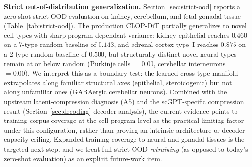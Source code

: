 \documentclass[11pt,a4paper]{article}
\begin{document}
\textbf{Strict out-of-distribution generalization.} Section~\ref{sec:strict-ood} reports a zero-shot strict-OOD evaluation on kidney, cerebellum, and fetal gonadal tissue (Table~\ref{tab:strict-ood}). The production CLOP-DiT partially generalizes to novel cell types with sharp program-dependent variance: kidney epithelial reaches $0.460$ on a 7-type random baseline of $0.143$, and adrenal cortex type~I reaches $0.875$ on a 2-type random baseline of $0.500$, but structurally-distinct novel neural types remain at or below random (Purkinje cells $= 0.00$, cerebellar interneurons $= 0.00$). We interpret this as a boundary test: the learned cross-type manifold extrapolates along familiar structural axes (epithelial, steroidogenic) but not along unfamiliar ones (GABAergic cerebellar neurons). Combined with the upstream latent-compression diagnosis (A5) and the scGPT-specific compression result (Section~\ref{sec:decoding} decoder analysis), the current evidence points to training-corpus coverage at the cell-program level as the practical limiting factor under this configuration, rather than proving an intrinsic architecture or decoder-capacity ceiling. Expanded training coverage to neural and gonadal tissues is the targeted next step, and we treat full strict-OOD \emph{retraining} (as opposed to today's zero-shot evaluation) as an explicit future-work item.
\end{document}
